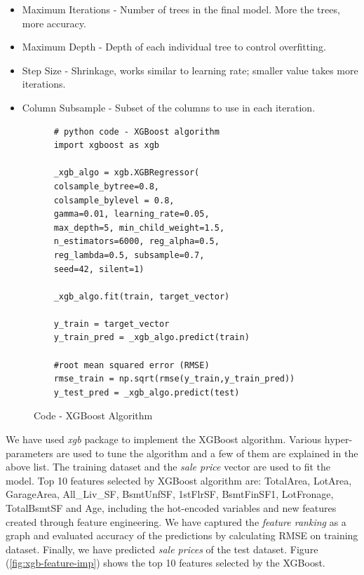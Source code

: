 \documentclass[sigconf]{acmart}
\begin{document}
\begin{itemize}
	\item  Maximum Iterations - Number of trees in the final model. More the trees, more accuracy.
	\item  Maximum Depth - Depth of each individual tree to control overfitting.
	\item  Step Size - Shrinkage, works similar to learning rate; smaller value takes more iterations.
	\item  Column Subsample - Subset of the columns to use in each iteration.
\end{itemize}

\begin{figure}[htb]
	\begin{verbatim}
	# python code - XGBoost algorithm
	import xgboost as xgb
	
	_xgb_algo = xgb.XGBRegressor(
	colsample_bytree=0.8,
	colsample_bylevel = 0.8,
	gamma=0.01,	learning_rate=0.05,
	max_depth=5, min_child_weight=1.5,
	n_estimators=6000, reg_alpha=0.5,
	reg_lambda=0.5,	subsample=0.7,
	seed=42, silent=1)
	
	_xgb_algo.fit(train, target_vector)   
	
	y_train = target_vector
	y_train_pred = _xgb_algo.predict(train)
	
	#root mean squared error (RMSE)
	rmse_train = np.sqrt(rmse(y_train,y_train_pred))	
	y_test_pred = _xgb_algo.predict(test)	
	\end{verbatim}
	\caption{Code - XGBoost Algorithm} \label{c:xgb} 
\end{figure}

We have used {\em xgb} package to implement the XGBoost algorithm. Various hyper-parameters are used to tune the algorithm and a few of them are explained in the above list. The training dataset and the {\em sale price} vector are used to fit the model. Top 10 features selected by XGBoost algorithm are: TotalArea, LotArea, GarageArea, All\_Liv\_SF, BsmtUnfSF, 1stFlrSF, BsmtFinSF1, LotFronage, TotalBsmtSF and Age, including the hot-encoded variables and new features created through feature engineering. We have captured the {\em feature ranking} as a graph and evaluated accuracy of the predictions by calculating RMSE on training dataset. Finally, we have predicted {\em sale prices} of the test dataset. Figure (\ref{fig:xgb-feature-imp}) shows the top 10 features selected by the XGBoost. 
\end{document}
